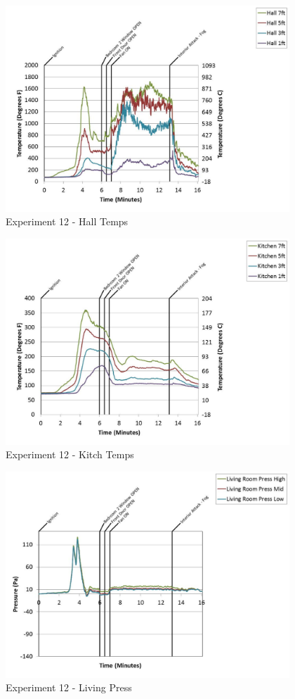 \documentclass{article}
\begin{document}
\begin{appendices}
	\clearpage

	\begin{figure}[h!]
		\centering
		\includegraphics[height=3.05in]{0_Images/Results_Charts/Exp_12_Charts/HallTemps.pdf}
		\caption{Experiment 12 - Hall Temps}
	\end{figure}
 

	\begin{figure}[h!]
		\centering
		\includegraphics[height=3.05in]{0_Images/Results_Charts/Exp_12_Charts/KitchTemps.pdf}
		\caption{Experiment 12 - Kitch Temps}
	\end{figure}
 
	\clearpage

	\begin{figure}[h!]
		\centering
		\includegraphics[height=3.05in]{0_Images/Results_Charts/Exp_12_Charts/LivingPress.pdf}
		\caption{Experiment 12 - Living Press}
	\end{figure}
 


\end{appendices}
\end{document}
